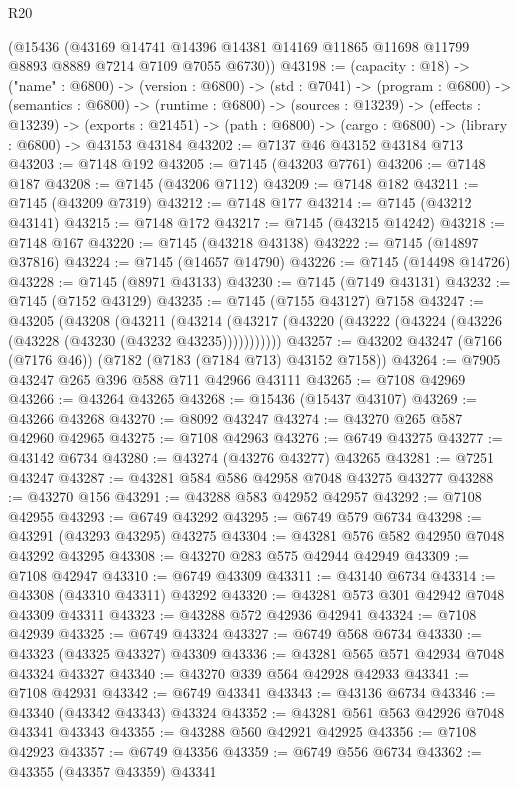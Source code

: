 \begin{lexlean}{R20}
\begin{coremodule}
{    (@15436
      (@43169 @14741 @14396 @14381 @14169 @11865 @11698 @11799 @8893 @8889 @7214 @7109 @7055 @6730))
@43198 := (capacity : @18) ->
  ("name" : @6800) ->
  (version : @6800) ->
  (std : @7041) ->
  (program : @6800) ->
  (semantics : @6800) ->
  (runtime : @6800) ->
  (sources : @13239) ->
  (effects : @13239) ->
  (exports : @21451) -> (path : @6800) -> (cargo : @6800) -> (library : @6800) -> @43153 @43184
@43202 := @7137 @46 @43152 @43184 @713
@43203 := @7148 @192
@43205 := @7145 (@43203 @7761)
@43206 := @7148 @187
@43208 := @7145 (@43206 @7112)
@43209 := @7148 @182
@43211 := @7145 (@43209 @7319)
@43212 := @7148 @177
@43214 := @7145 (@43212 @43141)
@43215 := @7148 @172
@43217 := @7145 (@43215 @14242)
@43218 := @7148 @167
@43220 := @7145 (@43218 @43138)
@43222 := @7145 (@14897 @37816)
@43224 := @7145 (@14657 @14790)
@43226 := @7145 (@14498 @14726)
@43228 := @7145 (@8971 @43133)
@43230 := @7145 (@7149 @43131)
@43232 := @7145 (@7152 @43129)
@43235 := @7145 (@7155 @43127) @7158
@43247 := @43205
    (@43208
      (@43211
        (@43214 (@43217 (@43220 (@43222 (@43224 (@43226 (@43228 (@43230 (@43232 @43235)))))))))))
@43257 := @43202 @43247 (@7166 (@7176 @46)) (@7182 (@7183 (@7184 @713) @43152 @7158))
@43264 := @7905 @43247 @265 @396 @588 @711 @42966 @43111
@43265 := @7108 @42969
@43266 := @43264 @43265
@43268 := @15436 (@15437 @43107)
@43269 := @43266 @43268
@43270 := @8092 @43247
@43274 := @43270 @265 @587 @42960 @42965
@43275 := @7108 @42963
@43276 := @6749 @43275
@43277 := @43142 @6734
@43280 := @43274 (@43276 @43277) @43265
@43281 := @7251 @43247
@43287 := @43281 @584 @586 @42958 @7048 @43275 @43277
@43288 := @43270 @156
@43291 := @43288 @583 @42952 @42957
@43292 := @7108 @42955
@43293 := @6749 @43292
@43295 := @6749 @579 @6734
@43298 := @43291 (@43293 @43295) @43275
@43304 := @43281 @576 @582 @42950 @7048 @43292 @43295
@43308 := @43270 @283 @575 @42944 @42949
@43309 := @7108 @42947
@43310 := @6749 @43309
@43311 := @43140 @6734
@43314 := @43308 (@43310 @43311) @43292
@43320 := @43281 @573 @301 @42942 @7048 @43309 @43311
@43323 := @43288 @572 @42936 @42941
@43324 := @7108 @42939
@43325 := @6749 @43324
@43327 := @6749 @568 @6734
@43330 := @43323 (@43325 @43327) @43309
@43336 := @43281 @565 @571 @42934 @7048 @43324 @43327
@43340 := @43270 @339 @564 @42928 @42933
@43341 := @7108 @42931
@43342 := @6749 @43341
@43343 := @43136 @6734
@43346 := @43340 (@43342 @43343) @43324
@43352 := @43281 @561 @563 @42926 @7048 @43341 @43343
@43355 := @43288 @560 @42921 @42925
@43356 := @7108 @42923
@43357 := @6749 @43356
@43359 := @6749 @556 @6734
@43362 := @43355 (@43357 @43359) @43341
}
\end{coremodule}
\end{lexlean}
